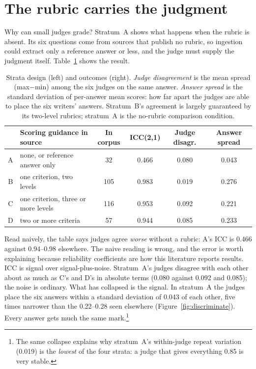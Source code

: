 \documentclass{article}
\newcommand{\num}[1]{#1}
\begin{document}
\section{The rubric carries the judgment}
\label{sec:rubric}

Why can small judges grade? Stratum~A shows what happens when the rubric is
absent. Its six questions come from sources that publish no rubric, so
ingestion could extract only a reference answer or less, and the judge must
supply the judgment itself. Table~\ref{tab:strata} shows the result.

\begin{table}[!ht]
\centering\small
\caption{Strata design (left) and outcomes (right). \emph{Judge disagreement}
is the mean spread (max$-$min) among the six judges on the same answer.
\emph{Answer spread} is the standard deviation of per-answer mean scores:
how far apart the judges are able to place the six writers' answers.
Stratum~B's agreement is largely guaranteed by its two-level rubrics;
stratum~A is the no-rubric comparison condition.}
\label{tab:strata}
\begin{tabular}{@{}clc@{\hspace{1.5em}}ccc@{}}
\toprule
& \textbf{Scoring guidance in source} & \textbf{In corpus}
& \textbf{ICC(2,1)} & \textbf{Judge disagr.} & \textbf{Answer spread} \\
\midrule
A & none, or reference answer only        & 32  & 0.466 & 0.080 & \num{0.043} \\
B & one criterion, two levels             & 105 & 0.983 & 0.019 & 0.276 \\
C & one criterion, three or more levels   & 116 & 0.953 & 0.092 & 0.221 \\
D & two or more criteria                  & 57  & 0.944 & 0.085 & 0.233 \\
\bottomrule
\end{tabular}
\end{table}

Read naively, the table says judges agree \emph{worse} without a rubric: A's
ICC is 0.466 against 0.94--0.98 elsewhere. The naive reading is wrong, and the
error is worth explaining because reliability coefficients are how this
literature reports results. ICC is signal over signal-plus-noise. Stratum~A's
judges disagree with each other about as much as C's and D's in absolute terms
(0.080 against 0.092 and 0.085); the noise is ordinary. What has collapsed is
the signal. In stratum~A the judges place the six answers within a standard
deviation of \num{0.043} of each other, five times narrower than the
0.22--0.28 seen elsewhere (Figure~\ref{fig:discriminate}). Every answer gets
much the same mark.\footnote{The same collapse explains why stratum~A's
within-judge repeat variation (0.019) is the \emph{lowest} of the four
strata: a judge that gives everything 0.85 is very stable.}
\end{document}

